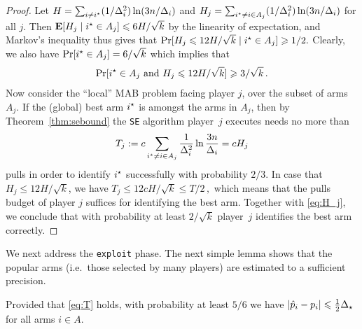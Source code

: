 \begin{proof}
Let $H = \sum_{i \ne i^\star} (1/\Delta_i^2) \ln (3n/\Delta_i)$ and
$H_j = \sum_{i^\star \ne i \in A_j} (1/\Delta_i^2) \ln (3n/\Delta_i)$ for all $j$.
Then $\mathbf{E}[H_j \mid i^\star \in A_j] \leqslant 6H/\sqrt{k}$ by the linearity of expectation, and Markov's inequality thus gives that
$
	\Pr[H_j \leqslant 12H/\sqrt{k} \mid i^\star \in A_j]
	\geqslant 1/2 .
$
Clearly, we also have $\Pr[i^\star \in A_j] = 6/\sqrt{k}$ which implies that
\begin{align} \label{eq:H_j}
	\Pr[i^\star \in A_j \mbox{ and } H_j \leqslant 12H/\sqrt{k}] \geqslant 3/\sqrt{k} \,.
\end{align}
Now consider the ``local'' MAB problem facing player $j$, over the subset of arms $A_j$. If the (global) best arm $i^\star$ is amongst the arms in $A_j$, then by Theorem~\ref{thm:sebound} the \texttt{SE} algorithm player~$j$ executes needs no more than
\begin{align*}
	T_j
	:= c \sum_{i^\star \ne i \in A_j} \frac{1}{\Delta_i^2}\ln \frac{3n}{\Delta_i}
	= c H_j
\end{align*}
pulls in order to identify $i^\star$ successfully with probability $2/3$. 
In case that $H_j \le 12H/\sqrt{k}$, we have
$
	T_j
	\le 12 c H / \sqrt{k}
	\le T/2 \,,
$
which means that the pulls budget of player $j$ suffices for identifying the
best arm. Together with \eqref{eq:H_j}, we conclude that with probability at
least $2/\sqrt{k}$ player~$j$ identifies the best arm correctly.
\end{proof}

We next address the \texttt{exploit} phase. The next simple lemma shows that the
popular arms (i.e.~those selected by many players) are estimated to a sufficient
precision.  


\begin{lemma} \label{lem:kexploit}
Provided that \eqref{eq:T} holds, with probability at least $5/6$
we have $|\hat{p}_i - p_i| \leqslant \tfrac{1}{2} \Delta_{\star}$ for all arms $i \in A$.
\end{lemma}



